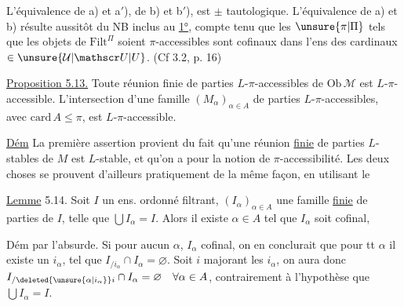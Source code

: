 
L'équivalence de a) et a$'$),  de b) et b$'$), est $\pm$ tautologique. L'équivalence de a) et b) résulte aussitôt du NB inclus au \uline{1°}, compte tenu que les $\unsure{\pi|\Pi}$ tels que les objets de $\mathrm{Filt}^{\Pi}$ soient $\pi$-accessibles sont cofinaux dans l'ens des cardinaux $\in\unsure{\mathcal U|\mathscr U|U}$. (Cf 3.2, p. 16)

\margin{\rule{0.4pt}{3cm}}\uline{Proposition 5.13.} Toute réunion finie de parties $L$-$\pi$-accessibles de $\mathrm{Ob}\,\mathcal M$ est $L$-$\pi$-accessible. L'intersection d'une famille $(M_\alpha)_{\alpha\in A}$ de parties $L$-$\pi$-accessibles, avec $\mathrm{card}\,A\leq\pi$, est $L$-$\pi$-accessible.

\uline{Dém} La première assertion provient du fait qu'une réunion \uline{finie} de parties $L$-stables de $M$ est $L$-stable,  et qu'on a  pour la notion de $\pi$-accessibilité. Les deux choses se prouvent d'ailleurs pratiquement de la même façon, en utilisant le

\uline{Lemme} 5.14. Soit $I$ un ens. ordonné filtrant, $(I_\alpha)_{\alpha\in A}$ une famille \uline{finie}  de parties de $I$, telle que $\bigcup I_\alpha=I$. Alors il existe $\alpha\in A$ tel que $I_\alpha$ soit cofinal, 



Dém par l'absurde. Si pour  aucun $\alpha$, $I_\alpha$  cofinal, on en conclurait que pour tt $\alpha$ il existe un $i_\alpha$, tel que $I_{/i_\alpha}\cap I_\alpha=\varnothing$. Soit $i$  majorant les $i_\alpha$, on aura donc $I_{/\deleted{\unsure{\alpha|i_\alpha}}i}\cap I_\alpha=\varnothing\quad\forall\alpha\in A$, contrairement à l'hypothèse que $\bigcup I_\alpha=I$.

